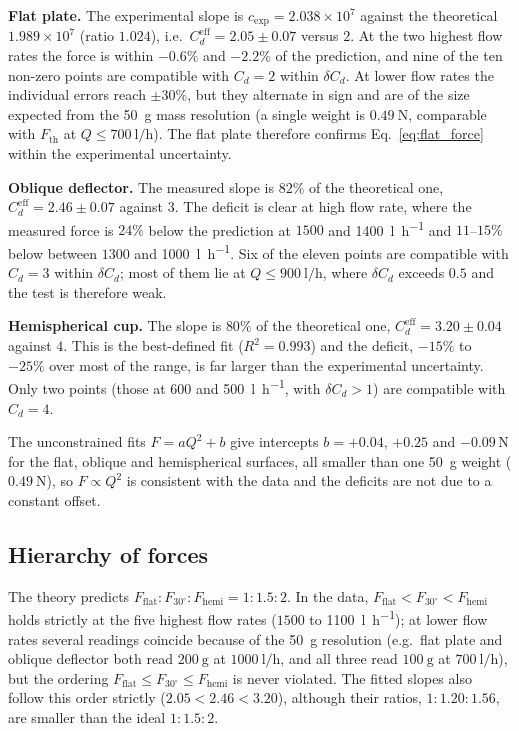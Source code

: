 \documentclass[11pt,a4paper]{article}
\numberwithin{equation}{section}
\newcommand{\Cd}{C_d}
\newcommand{\Fth}{F_{\mathrm{th}}}
\begin{document}
 
\textbf{Flat plate.} The experimental slope is $c_{\exp}=2.038\times10^{7}$ against the theoretical $1.989\times10^{7}$ (ratio $1.024$), i.e.\ $\Cd^{\mathrm{eff}}=2.05\pm0.07$ versus $2$. At the two highest flow rates the force is within $-0.6\%$ and $-2.2\%$ of the prediction, and nine of the ten non-zero points are compatible with $\Cd=2$ within $\delta\Cd$. At lower flow rates the individual errors reach $\pm30\%$, but they alternate in sign and are of the size expected from the \SI{50}{\gram} mass resolution (a single weight is $\SI{0.49}{\newton}$, comparable with $\Fth$ at $Q\le\SI{700}{\litre\per\hour}$). The flat plate therefore confirms Eq.~\eqref{eq:flat_force} within the experimental uncertainty.
 
\textbf{Oblique deflector.} The measured slope is $82\%$ of the theoretical one, $\Cd^{\mathrm{eff}}=2.46\pm0.07$ against $3$. The deficit is clear at high flow rate, where the measured force is $24\%$ below the prediction at $1500$ and \SI{1400}{\litre\per\hour} and $11$--$15\%$ below between $1300$ and \SI{1000}{\litre\per\hour}. Six of the eleven points are compatible with $\Cd=3$ within $\delta\Cd$; most of them lie at $Q\le\SI{900}{\litre\per\hour}$, where $\delta\Cd$ exceeds $0.5$ and the test is therefore weak.
 
\textbf{Hemispherical cup.} The slope is $80\%$ of the theoretical one, $\Cd^{\mathrm{eff}}=3.20\pm0.04$ against $4$. This is the best-defined fit ($R^2=0.993$) and the deficit, $-15\%$ to $-25\%$ over most of the range, is far larger than the experimental uncertainty. Only two points (those at 600 and \SI{500}{\litre\per\hour}, with $\delta\Cd>1$) are compatible with $\Cd=4$.
 
The unconstrained fits $F=aQ^2+b$ give intercepts $b=+0.04$, $+0.25$ and $-0.09\,\si{\newton}$ for the flat, oblique and hemispherical surfaces, all smaller than one \SI{50}{\gram} weight ($\SI{0.49}{\newton}$), so $F\propto Q^2$ is consistent with the data and the deficits are not due to a constant offset.
 
\subsection{Hierarchy of forces}
 
The theory predicts $F_{\text{flat}}:F_{30^\circ}:F_{\text{hemi}}=1:1.5:2$. In the data, $F_{\text{flat}}<F_{30^\circ}<F_{\text{hemi}}$ holds strictly at the five highest flow rates ($1500$ to \SI{1100}{\litre\per\hour}); at lower flow rates several readings coincide because of the \SI{50}{\gram} resolution (e.g.\ flat plate and oblique deflector both read $\SI{200}{\gram}$ at $\SI{1000}{\litre\per\hour}$, and all three read $\SI{100}{\gram}$ at $\SI{700}{\litre\per\hour}$), but the ordering $F_{\text{flat}}\le F_{30^\circ}\le F_{\text{hemi}}$ is never violated. The fitted slopes also follow this order strictly ($2.05<2.46<3.20$), although their ratios, $1:1.20:1.56$, are smaller than the ideal $1:1.5:2$.
 
\end{document}
